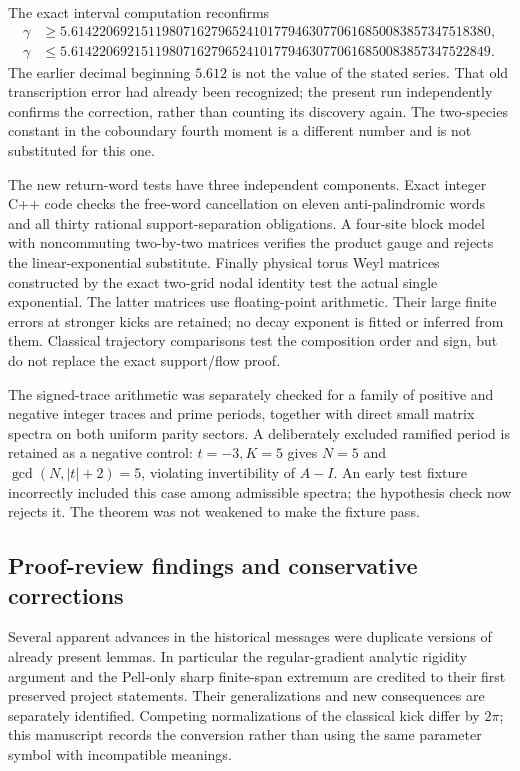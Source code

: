 The exact interval computation reconfirms
\[
 \begin{aligned}
 \gamma&\geq5.614220692151198071627965241017794630770616850083857347518380,\\
 \gamma&\leq5.614220692151198071627965241017794630770616850083857347522849.
 \end{aligned}
\]
The earlier decimal beginning $5.612$ is not the value of the stated series.
That old transcription error had already been recognized; the present run
independently confirms the correction, rather than counting its discovery
again. The two-species constant in the coboundary fourth moment is a different
number and is not substituted for this one.

The new return-word tests have three independent components. Exact integer
C++ code checks the free-word cancellation on eleven anti-palindromic words
and all thirty rational support-separation obligations. A four-site block
model with noncommuting two-by-two matrices verifies the product gauge and
rejects the linear-exponential substitute. Finally physical torus Weyl
matrices constructed by the exact two-grid nodal identity test the actual
single exponential. The latter matrices use floating-point arithmetic.
Their large finite errors at stronger kicks are retained; no decay exponent
is fitted or inferred from them. Classical trajectory comparisons test the
composition order and sign, but do not replace the exact support/flow proof.

The signed-trace arithmetic was separately checked for a family of positive
and negative integer traces and prime periods, together with direct small
matrix spectra on both uniform parity sectors. A deliberately excluded
ramified period is retained as a negative control: $t=-3,K=5$ gives $N=5$
and $\gcd(N,|t|+2)=5$, violating invertibility of $A-I$. An early test
fixture incorrectly included this case among admissible spectra; the
hypothesis check now rejects it. The theorem was not weakened to make the
fixture pass.

\subsection{Proof-review findings and conservative corrections}
Several apparent advances in the historical messages were duplicate versions
of already present lemmas. In particular the regular-gradient analytic
rigidity argument and the Pell-only sharp finite-span extremum are credited
to their first preserved project statements. Their generalizations and new
consequences are separately identified. Competing normalizations of the
classical kick differ by $2\pi$; this manuscript records the conversion
rather than using the same parameter symbol with incompatible meanings.

